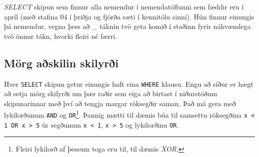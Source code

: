 \begin{example}
\caption[LIKE með nákvæmum stafafjölda]{\emph{SELECT} skipun sem finnur alla nemendur í nemendatöflunni sem fæddir eru í apríl (með stafina 04 í þriðja og fjórða sæti í kennitölu sinni). Hún finnur einungis þá nemendur, vegna þess að \_ táknin tvö geta komið í staðinn fyrir nákvæmlega tvö önnur tákn, hvorki fleiri né færri.}
\label{sql:k4d12-like-kennitala}
\centering
{}
\end{example}

\FloatBarrier
\subsection{Mörg aðskilin skilyrði} %
Hver \verb|SELECT| skipun getur einungis haft eina \verb|WHERE| klausu. Engu að síður er hægt að setja mörg skilyrði um þær raðir sem eiga að birtast í niðurstöðum skipunarinnar með því að tengja margar röksegðir saman. Það má gera með lykilorðunum \verb|AND| og \verb|OR|\footnote{Fleiri lykilorð af þessum toga eru til, til dæmis \emph{XOR}.}. Þannig mætti til dæmis búa til samsettu röksegðina \verb|x < 1 OR x > 5| úr segðunum \verb|x < 1|, \verb|x > 5| og lykilorðinu \verb|OR|.

